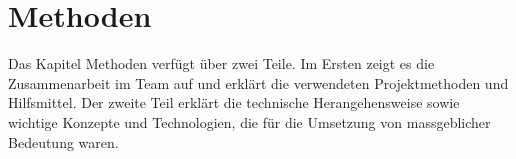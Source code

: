 \chapter{Methoden}

Das Kapitel Methoden verfügt über zwei Teile. Im Ersten zeigt es die Zusammenarbeit im Team
auf und erklärt die verwendeten Projektmethoden und Hilfsmittel.
Der zweite Teil erklärt die technische Herangehensweise sowie wichtige Konzepte und Technologien,
die für die Umsetzung von massgeblicher Bedeutung waren.


